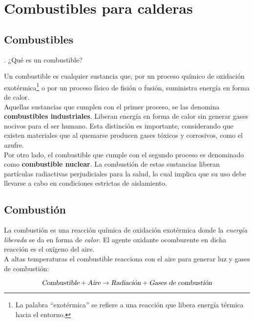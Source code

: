 \section{Combustibles para calderas}
\subsection{Combustibles}

\begin{preguntas}
	. ¿Qué es un combustible?
\end{preguntas}

Un combustible es cualquier sustancia que, por un proceso químico de oxidación exotérmica\footnote{La palabra ``exotérmica'' se refiere a una reacción que libera energía térmica hacia el entorno.} o por un proceso físico de fisión o fusión, suministra energía en forma de calor.\\

Aquellas sustancias que cumplen con el primer proceso, se las denomina \textbf{combustibles industriales}. Liberan energía en forma de calor sin generar gases nocivos para el ser humano.
Esta distinción es importante, considerando que existen materiales que al quemarse producen gases tóxicos y corrosivos, como el azufre.\\

Por otro lado, el combustible que cumple con el segundo proceso es denominado como \textbf{combustible nuclear}. La combustión de estas sustancias liberan partículas radiactivas perjudiciales para la salud, lo cual implica que su uso debe llevarse a cabo en condiciones estrictas de aislamiento.

\subsection{Combustión}

La combustión es una reacción química de oxidación exotérmica donde la \textsl{energía liberada} se da en forma de \textsl{calor}. El agente oxidante ocomburente en dicha reacción es el oxígeno del aire.\\

A altas temperaturas el combustible reacciona con el aire para generar luz y gases de combustión:

\begin{equation}
	\textsl{Combustible} + \textsl{Aire} \rightarrow \textsl{Radiación} + \textsl{Gases de combustión}
\end{equation}


